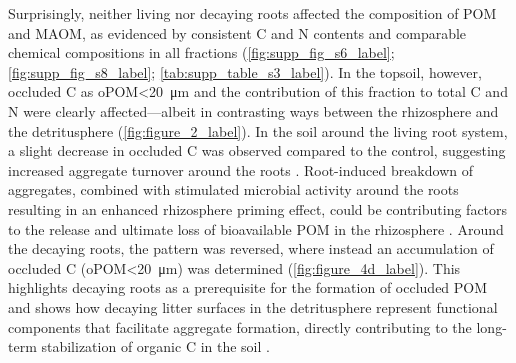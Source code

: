 Surprisingly, neither living nor decaying roots affected the composition of POM and MAOM, as evidenced by consistent C and N contents and comparable chemical compositions in all fractions (\cref{fig:supp_fig_s6_label}; \cref{fig:supp_fig_s8_label}; \cref{tab:supp_table_s3_label}). In the topsoil, however, occluded C as oPOM<\SI{20}{\micro\metre} and the contribution of this fraction to total C and N were clearly affected---albeit in contrasting ways between the rhizosphere and the detritusphere (\cref{fig:figure_2_label}). In the soil around the living root system, a slight decrease in occluded C was observed compared to the control, suggesting increased aggregate turnover around the roots \citep{Wang2020}. Root-induced breakdown of aggregates, combined with stimulated microbial activity around the roots resulting in an enhanced rhizosphere priming effect, could be contributing factors to the release and ultimate loss of bioavailable POM in the rhizosphere \citep{Cheng2009}. Around the decaying roots, the pattern was reversed, where instead an accumulation of occluded C (oPOM<\SI{20}{\micro\metre}) was determined (\cref{fig:figure_4d_label}). This highlights decaying roots as a prerequisite for the formation of occluded POM and shows how decaying litter surfaces in the detritusphere represent functional components that facilitate aggregate formation, directly contributing to the long-term stabilization of organic C in the soil \citep{Witzgall2021}.

